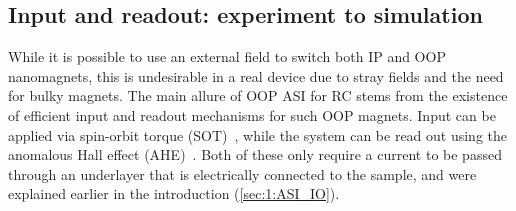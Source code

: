\subsection{Input and readout: experiment to simulation}
While it is possible to use an external field to switch both IP and OOP nanomagnets, this is undesirable in a real device due to stray fields and the need for bulky magnets.
The main allure of OOP ASI for RC stems from the existence of efficient input and readout mechanisms for such OOP magnets.
Input can be applied via spin-orbit torque (SOT)~\cite{SOT_FM_AFM,SOTswitchingCoPt}, while the system can be read out using the anomalous Hall effect (AHE)~\cite{AHE}.
Both of these only require a current to be passed through an underlayer that is electrically connected to the sample, and were explained earlier in the introduction (\cref{sec:1:ASI_IO}).

